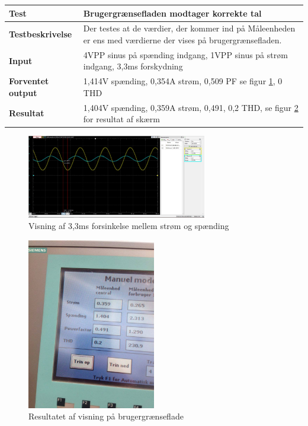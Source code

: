 \begin{center}
	\begin{tabular}{ | m{} | m{}|} 
		\hline
		\textbf{Test}					&Brugergrænsefladen modtager korrekte tal \\ \hline
		\textbf{Testbeskrivelse}		&Der testes at de værdier, der kommer ind på Måleenheden er ens med værdierne der vises på brugergrænsefladen. \\ \hline
		\textbf{Input}					&4VPP sinus på spænding indgang, 1VPP sinus på strøm indgang, 3,3ms forskydning \\ \hline
		\textbf{Forventet output}		&1,414V spænding, 0,354A strøm, 0,509 PF se figur \ref{fig:PFtest1}, 0 THD \\ \hline
		\textbf{Resultat}				&1,404V spænding, 0,359A strøm, 0,491, 0,2 THD,  se figur \ref*{fig:visningtest1} for resultat af skærm  \\ \hline
	\end{tabular}
\end{center}

\begin{figure}[H] %
	\centering
	\includegraphics[width=0.7\textwidth]{Test/PFTest1}
	\caption{Visning af 3,3ms forsinkelse mellem strøm og spænding}
	\label{fig:PFtest1}
\end{figure}

\begin{figure}[H] %
	\centering
	\includegraphics[width=0.5\textwidth]{Test/Visningstest1}
	\caption{Resultatet af visning på brugergrænseflade}
	\label{fig:visningtest1}
\end{figure}


